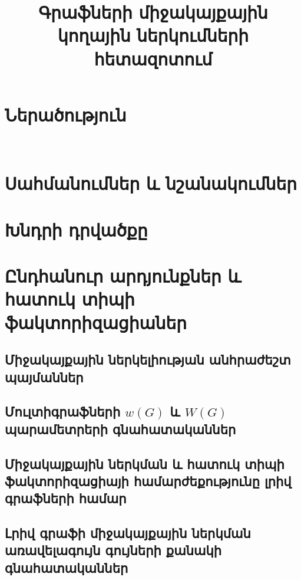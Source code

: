 \documentclass[a4paper,12pt,final]{article}
\title{Գրաֆների միջակայքային կողային ներկումների հետազոտում}
\date{}
\let\stdsection\section
\renewcommand\section{\newpage\stdsection}
\begin{document}


\tableofcontents
 
\section*{Ներածություն}\


\section*{Սահմանումներ և նշանակումներ}


\section*{Խնդրի դրվածքը}




\section{Ընդհանուր արդյունքներ և հատուկ տիպի ֆակտորիզացիաներ}

\subsection{Միջակայքային ներկելիության անհրաժեշտ պայմաններ}


\subsection{Մուլտիգրաֆների \texorpdfstring{$w(G)$}{w(G)} և \texorpdfstring{$W(G)$}{W(G)} պարամետրերի գնահատականներ}


\subsection{Միջակայքային ներկման և հատուկ տիպի ֆակտորիզացիայի համարժեքությունը լրիվ գրաֆների համար}


\subsection{Լրիվ գրաֆի միջակայքային ներկման առավելագույն գույների քանակի գնահատականներ}

\end{document}
